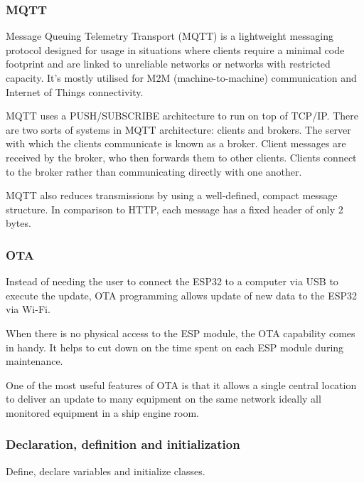 \subsubsection{MQTT}

Message Queuing Telemetry Transport (MQTT) is a lightweight messaging protocol designed for usage in situations where clients require a minimal code footprint and are linked to unreliable networks or networks with restricted capacity. It’s mostly utilised for M2M (machine-to-machine) communication and Internet of Things connectivity.  

MQTT uses a PUSH/SUBSCRIBE architecture to run on top of TCP/IP. There are two sorts of systems in MQTT architecture: clients and brokers. The server with which the clients communicate is known as a broker. Client messages are received by the broker, who then forwards them to other clients. Clients connect to the broker rather than communicating directly with one another.

MQTT also reduces transmissions by using a well-defined, compact message structure. In comparison to HTTP, each message has a fixed header of only 2 bytes.


\subsubsection{OTA}

Instead of needing the user to connect the ESP32 to a computer via USB to execute the update, OTA programming allows update of new data to the ESP32 via Wi-Fi.

When there is no physical access to the ESP module, the OTA capability comes in handy. It helps to cut down on the time spent on each ESP module during maintenance.

One of the most useful features of OTA is that it allows a single central location to deliver an update to many equipment on the same network ideally all monitored equipment in a ship engine room.

\subsubsection{Declaration, definition and initialization}

Define, declare variables and initialize classes. 

